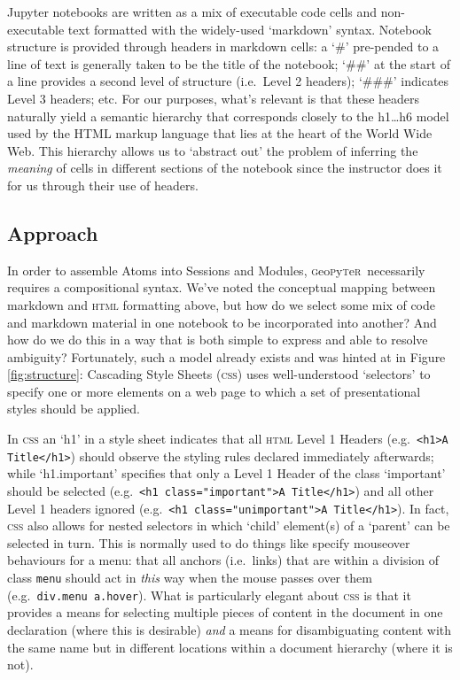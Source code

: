 \documentclass[letter, 11pt,titlepage]{article}
\newcommand{\gp}{\textsc{g}eo\textsc{p}y\textsc{t}e\textsc{r}~\/}
\newcommand{\eg}{e.g.~\/}
\newcommand{\ie}{i.e.~\/}
\begin{document}
Jupyter notebooks are written as a mix of executable code cells and non-executable text formatted with the widely-used `markdown' syntax. Notebook structure is provided through headers in markdown cells: a `\#' pre-pended to a line of text is generally taken to be the title of the notebook; `\#\#' at the start of a line provides a second level of structure (\ie Level 2 headers); `\#\#\#' indicates Level 3 headers; etc. For our purposes, what's relevant is that these headers naturally yield a semantic hierarchy that corresponds closely to the h1\ldots{}h6 model used by the HTML markup language that lies at the heart of the World Wide Web. This hierarchy allows us to `abstract out' the problem of inferring the \emph{meaning} of cells in different sections of the notebook since the instructor does it for us through their use of headers.

\subsection{Approach}

In order to assemble Atoms into Sessions and Modules, \gp necessarily requires a compositional syntax. We've noted the conceptual mapping between markdown and \textsc{html} formatting above, but how do we select some mix of code and markdown material in one notebook to be incorporated into another? And how do we do this in a way that is both simple to express and able to resolve ambiguity? Fortunately, such a model already exists and was hinted at in Figure \ref{fig:structure}: Cascading Style Sheets (\textsc{css}) uses well-understood `selectors' to specify one or more elements on a web page to which a set of presentational styles should be applied. 

In \textsc{css} an `h1' in a style sheet indicates that all \textsc{html} Level 1 Headers (\eg \texttt{<h1>A Title</h1>}) should observe the styling rules declared immediately afterwards; while `h1.important' specifies that only a Level 1 Header of the class `important' should be selected (\eg \texttt{<h1 class="important">A Title</h1>}) and all other Level 1 headers ignored (\eg \texttt{<h1 class="unimportant">A Title</h1>}). In fact, \textsc{css} also allows for nested selectors in which `child' element(s) of a `parent' can be selected in turn. This is normally used to do things like specify mouseover behaviours for a menu: that all anchors (\ie links) that are within a division of class \texttt{menu} should act in \emph{this} way when the mouse passes over them (\eg \texttt{div.menu a.hover}). What is particularly elegant about \textsc{css} is that it provides a means for selecting multiple pieces of content in the document in one declaration (where this is desirable) \emph{and} a means for disambiguating content with the same name but in different locations within a document hierarchy (where it is not). 
\end{document}
